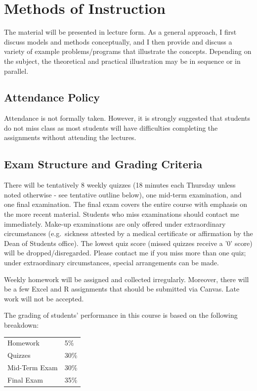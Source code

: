 \documentclass[11pt,fleqn,oneside]{book}
\begin{document}
\section*{Methods of Instruction}

The material will be presented in lecture form.  As a general approach, I first discuss models and methods conceptually, and I then provide and discuss a variety of example problems/programs that illustrate the concepts.  Depending on the subject, the theoretical and practical illustration may be in sequence or in parallel.

\subsection*{Attendance Policy}

Attendance is not formally taken. However, it is strongly suggested that students do not miss class as most students will have difficulties completing the assignments without attending the lectures.

\subsection*{Exam Structure and Grading Criteria}

There will be tentatively 8 weekly quizzes (18 minutes each Thursday unless noted otherwise - see tentative outline below), one mid-term examination, and one final examination.  The final exam covers the entire course with emphasis on the more recent material. Students who miss examinations should contact me immediately. Make-up examinations are only offered under extraordinary circumstances (e.g.\ sickness attested by a medical certificate or affirmation by the Dean of Students office). The lowest quiz score (missed quizzes receive a '0' score) will be dropped/disregarded. Please contact me if you miss more than one quiz; under extraordinary circumstances, special arrangements can be made.

Weekly homework will be assigned and collected irregularly. Moreover, there will be a few Excel and R assignments that should be submitted via Canvas. Late work will not be accepted.    

The grading of students' performance in this course is based on the following breakdown:
\begin{center}
\begin{tabular}{|l | l |}
\hline
Homework		& 5\%  \\
Quizzes	  		& 30\% \\
Mid-Term Exam	& 30\% \\
Final Exam 		& 35\% \\ 
\hline
\end{tabular}
\end{center}
\end{document}
